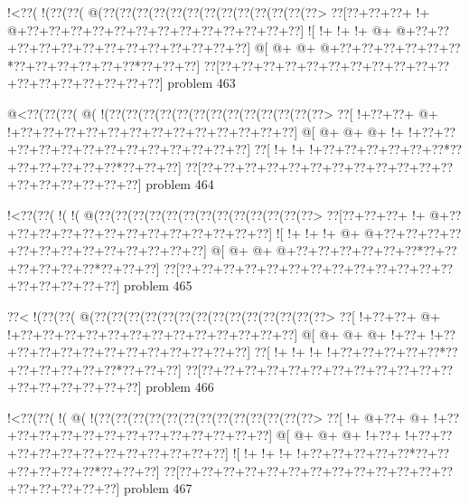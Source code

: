 \vbox{\vbox{\goo
\- !<\0??(\- !(\0??(\0??(\- @(\0??(\0??(\0??(\0??(\0??(\0??(\0??(\0??(\0??(\0??(\0??(\0??(\0??>
\0??[\0??+\0??+\0??+\- !+\- @+\0??+\0??+\0??+\0??+\0??+\0??+\0??+\0??+\0??+\0??+\0??+\0??+\0??]
\- ![\- !+\- !+\- !+\- @+\- @+\0??+\0??+\0??+\0??+\0??+\0??+\0??+\0??+\0??+\0??+\0??+\0??+\0??]
\- @[\- @+\- @+\- @+\0??+\0??+\0??+\0??+\0??+\0??*\0??+\0??+\0??+\0??+\0??+\0??*\0??+\0??+\0??]
\0??[\0??+\0??+\0??+\0??+\0??+\0??+\0??+\0??+\0??+\0??+\0??+\0??+\0??+\0??+\0??+\0??+\0??+\0??]
}
\hfil problem 463\hfil\break
}



\vbox{\vbox{\goo
\- @<\0??(\0??(\0??(\- @(\- !(\0??(\0??(\0??(\0??(\0??(\0??(\0??(\0??(\0??(\0??(\0??(\0??(\0??>
\0??[\- !+\0??+\0??+\- @+\- !+\0??+\0??+\0??+\0??+\0??+\0??+\0??+\0??+\0??+\0??+\0??+\0??+\0??]
\- @[\- @+\- @+\- @+\- !+\- !+\0??+\0??+\0??+\0??+\0??+\0??+\0??+\0??+\0??+\0??+\0??+\0??+\0??]
\0??[\- !+\- !+\- !+\0??+\0??+\0??+\0??+\0??+\0??*\0??+\0??+\0??+\0??+\0??+\0??*\0??+\0??+\0??]
\0??[\0??+\0??+\0??+\0??+\0??+\0??+\0??+\0??+\0??+\0??+\0??+\0??+\0??+\0??+\0??+\0??+\0??+\0??]
}
\hfil problem 464\hfil\break
}



\vbox{\vbox{\goo
\- !<\0??(\0??(\- !(\- !(\- @(\0??(\0??(\0??(\0??(\0??(\0??(\0??(\0??(\0??(\0??(\0??(\0??(\0??>
\0??[\0??+\0??+\0??+\- !+\- @+\0??+\0??+\0??+\0??+\0??+\0??+\0??+\0??+\0??+\0??+\0??+\0??+\0??]
\- ![\- !+\- !+\- !+\- @+\- @+\0??+\0??+\0??+\0??+\0??+\0??+\0??+\0??+\0??+\0??+\0??+\0??+\0??]
\- @[\- @+\- @+\- @+\0??+\0??+\0??+\0??+\0??+\0??*\0??+\0??+\0??+\0??+\0??+\0??*\0??+\0??+\0??]
\0??[\0??+\0??+\0??+\0??+\0??+\0??+\0??+\0??+\0??+\0??+\0??+\0??+\0??+\0??+\0??+\0??+\0??+\0??]
}
\hfil problem 465\hfil\break
}



\vbox{\vbox{\goo
\0??<\- !(\0??(\0??(\- @(\0??(\0??(\0??(\0??(\0??(\0??(\0??(\0??(\0??(\0??(\0??(\0??(\0??(\0??>
\0??[\- !+\0??+\0??+\- @+\- !+\0??+\0??+\0??+\0??+\0??+\0??+\0??+\0??+\0??+\0??+\0??+\0??+\0??]
\- @[\- @+\- @+\- @+\- !+\0??+\- !+\0??+\0??+\0??+\0??+\0??+\0??+\0??+\0??+\0??+\0??+\0??+\0??]
\0??[\- !+\- !+\- !+\- !+\0??+\0??+\0??+\0??+\0??*\0??+\0??+\0??+\0??+\0??+\0??*\0??+\0??+\0??]
\0??[\0??+\0??+\0??+\0??+\0??+\0??+\0??+\0??+\0??+\0??+\0??+\0??+\0??+\0??+\0??+\0??+\0??+\0??]
}
\hfil problem 466\hfil\break
}



\vbox{\vbox{\goo
\- !<\0??(\0??(\- !(\- @(\- !(\0??(\0??(\0??(\0??(\0??(\0??(\0??(\0??(\0??(\0??(\0??(\0??(\0??>
\0??[\- !+\- @+\0??+\- @+\- !+\0??+\0??+\0??+\0??+\0??+\0??+\0??+\0??+\0??+\0??+\0??+\0??+\0??]
\- @[\- @+\- @+\- @+\- !+\0??+\- !+\0??+\0??+\0??+\0??+\0??+\0??+\0??+\0??+\0??+\0??+\0??+\0??]
\- ![\- !+\- !+\- !+\- !+\0??+\0??+\0??+\0??+\0??*\0??+\0??+\0??+\0??+\0??+\0??*\0??+\0??+\0??]
\0??[\0??+\0??+\0??+\0??+\0??+\0??+\0??+\0??+\0??+\0??+\0??+\0??+\0??+\0??+\0??+\0??+\0??+\0??]
}
\hfil problem 467\hfil\break
}



